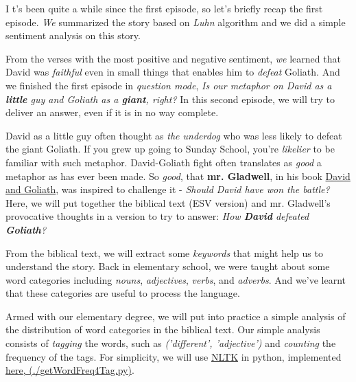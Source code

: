 \documentclass{article}
\begin{document}
\begin{multicols}{2}

\lettrine[lines=3]{I}{ } t's been quite a while since the first episode, so let's briefly recap the first episode. 
\textit{We} summarized the story based on \textit{Luhn} algorithm and we did a simple sentiment analysis on this story.

From the verses with the most positive and negative sentiment, 
\textit{we} learned that David was \textit{faithful} even in small things that enables him to \textit{defeat} Goliath. 
And we finished the first episode in \textit{question mode}, 
\textit{Is our metaphor on David as a \textbf{little} guy and Goliath as a \textbf{giant}, \textit{right}?}
In this second episode, we will try to deliver an answer, even if it is in no way complete.

\closearticle

David as a little guy often thought as \textit{the underdog} who was less likely to defeat the giant Goliath.
If you grew up going to Sunday School, you're \textit{likelier} to be familiar with such metaphor. 
David-Goliath fight often translates as \textit{good} a metaphor as has ever been made.
So \textit{good}, that \textbf{mr. Gladwell}, in his book \href{http://www.amazon.com/David-Goliath-Underdogs-Misfits-Battling/dp/0316204366}{David and Goliath}, was inspired to challenge it - \textit{Should David have won the battle?}
Here, we will put together the biblical text (ESV version) and mr. Gladwell's provocative thoughts in a version to try to answer: \textit{How \textbf{David} defeated \textbf{Goliath}?}

From the biblical text, we will extract some \textit{keywords} that might help us to understand the story.
Back in elementary school, we were taught about some word categories including \textit{nouns}, \textit{adjectives}, \textit{verbs}, and \textit{adverbs}.
And we've learnt that these categories are useful to process the language. 

Armed with our elementary degree, we will put into practice a simple analysis of the distribution of word categories in the biblical text.
Our simple analysis consists of \textit{tagging} the words, such as \textit{('different', 'adjective')} and \textit{counting} the frequency of the tags.
For simplicity, we will use \href{http://nltk.org/}{NLTK} in python, implemented \href{https://github.com/rickylim19/DavidGoliath}{here, (./getWordFreq4Tag.py)}. 


\end{multicols}
\end{document}
